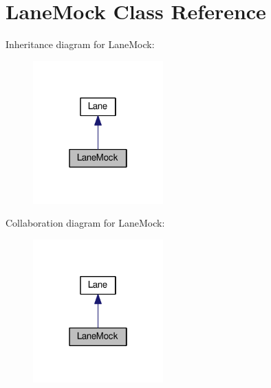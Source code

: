 \hypertarget{classLaneMock}{}\section{Lane\+Mock Class Reference}
\label{classLaneMock}


Inheritance diagram for Lane\+Mock\+:
\nopagebreak
\begin{figure}[H]
\begin{center}
\leavevmode
\includegraphics[width=142pt]{classLaneMock__inherit__graph}
\end{center}
\end{figure}


Collaboration diagram for Lane\+Mock\+:
\nopagebreak
\begin{figure}[H]
\begin{center}
\leavevmode
\includegraphics[width=142pt]{classLaneMock__coll__graph}
\end{center}
\end{figure}
